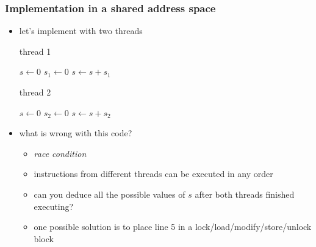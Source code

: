 \begin{frame}[fragile]
%
  \frametitle{Implementation in a shared address space}
%
  \begin{itemize}
%
  \item let's implement with two threads

    \vspace{.5em}
    \begin{minipage}{.40\linewidth}
      \begin{algorithm}[H]
%
        \footnotesize
        \DontPrintSemicolon
        \NoCaptionOfAlgo
        \SetAlCapHSkip{0ex}
%
        \caption{\hspace{1em}thread 1}
        \vspace{.5em}
%
        $s \leftarrow 0$ \;
        $s_{1} \leftarrow 0$ \;
        $s \leftarrow s+s_{1}$ \;
%
        \vspace{.5em}
%
      \end{algorithm}
    \end{minipage}
%
    \hspace{.1\linewidth}
%
    \begin{minipage}{.40\linewidth}
      \begin{algorithm}[H]
%
        \footnotesize
        \DontPrintSemicolon
        \NoCaptionOfAlgo
        \SetAlCapHSkip{0ex}
%
        \caption{\hspace{1em}thread 2}
        \vspace{.5em}
%
        $s \leftarrow 0$ \;
        $s_{2} \leftarrow 0$ \;
        $s \leftarrow s+s_{2}$ \;
%
        \vspace{.5em}
      \end{algorithm}
    \end{minipage}
    \vspace{.5em}
%
  \item what is wrong with this code? 
%
    \begin{itemize}
    \item {\em race condition}
    \item instructions from different threads can be executed in any order
    \item can you deduce all the possible values of $s$ after both threads finished executing?
    \item one possible solution is to place line 5 in a lock/load/modify/store/unlock block
    \end{itemize}
%
  \end{itemize}
%
\end{frame}

